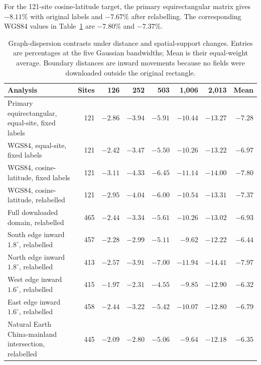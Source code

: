 \documentclass[namedate,webpdf,modern,mediumone]{oup-authoring-template}
\theoremstyle{thmstyleone}
\begin{document}
For the 121-site cosine-latitude target, the primary equirectangular matrix
gives $-8.11\%$ with original labels and $-7.67\%$ after relabelling. The
corresponding WGS84 values in Table~\ref{tab:domain-scale-curves} are
$-7.80\%$ and $-7.37\%$.

\begin{table}[htbp]
\centering
\caption{Graph-dispersion contrasts under distance and spatial-support
changes. Entries are percentages at the five Gaussian bandwidths; Mean is
their equal-weight average. Boundary distances are inward movements because
no fields were downloaded outside the original rectangle.}
\label{tab:domain-scale-curves}
\scriptsize
\setlength{\tabcolsep}{3.2pt}
\begin{tabularx}{\textwidth}{Xrrrrrrr}
\toprule
Analysis & Sites & 126 & 252 & 503 & 1,006 & 2,013 & Mean \\
\midrule
Primary equirectangular, equal-site, fixed labels
  & 121 & $-2.86$ & $-3.94$ & $-5.91$ & $-10.44$ & $-13.27$ & $-7.28$ \\
WGS84, equal-site, fixed labels
  & 121 & $-2.42$ & $-3.47$ & $-5.50$ & $-10.26$ & $-13.22$ & $-6.97$ \\
WGS84, cosine-latitude, fixed labels
  & 121 & $-3.11$ & $-4.33$ & $-6.45$ & $-11.14$ & $-14.00$ & $-7.80$ \\
WGS84, cosine-latitude, relabelled
  & 121 & $-2.95$ & $-4.04$ & $-6.00$ & $-10.54$ & $-13.31$ & $-7.37$ \\
Full downloaded domain, relabelled
  & 465 & $-2.44$ & $-3.34$ & $-5.61$ & $-10.26$ & $-13.02$ & $-6.93$ \\
South edge inward $1.8^\circ$, relabelled
  & 457 & $-2.28$ & $-2.99$ & $-5.11$ & $-9.62$ & $-12.22$ & $-6.44$ \\
North edge inward $1.8^\circ$, relabelled
  & 413 & $-2.57$ & $-3.91$ & $-7.00$ & $-11.94$ & $-14.41$ & $-7.97$ \\
West edge inward $1.6^\circ$, relabelled
  & 415 & $-1.97$ & $-2.31$ & $-4.55$ & $-9.85$ & $-12.90$ & $-6.32$ \\
East edge inward $1.6^\circ$, relabelled
  & 458 & $-2.44$ & $-3.22$ & $-5.42$ & $-10.07$ & $-12.80$ & $-6.79$ \\
Natural Earth China-mainland intersection, relabelled
  & 445 & $-2.09$ & $-2.80$ & $-5.06$ & $-9.64$ & $-12.18$ & $-6.35$ \\
\bottomrule
\end{tabularx}
\end{table}
\end{document}
